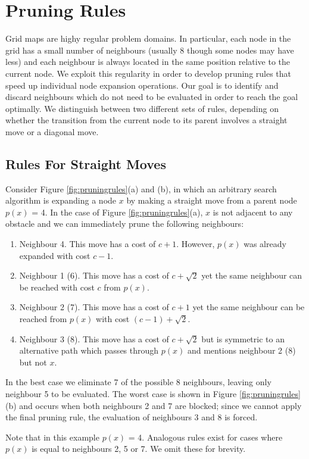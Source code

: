 \section{Pruning Rules}
Grid maps are highy regular problem domains. 
In particular, each node in the grid has a small number of neighbours (usually
8 though some nodes may have less) and each
neighbour is always located in the same position relative to the current node.
We exploit this regularity in order to develop pruning rules that speed up 
individual node expansion operations.
Our goal is to identify and discard neighbours
which do not need to be evaluated in order to reach the goal optimally.
We distinguish between two different sets of rules, depending on whether the 
transition from the current node to its parent involves a straight move or a
diagonal move.

\subsection{Rules For Straight Moves}
\label{sec:prunestraight}
Consider Figure \ref{fig:pruningrules}(a) and (b), in which an arbitrary search
algorithm is expanding a node $x$ by making a straight move from a parent node
$p(x)$ = 4.  In the case of Figure \ref{fig:pruningrules}(a), $x$ is not adjacent to
any obstacle and we can immediately prune the following neighbours:

\begin{enumerate}

\item Neighbour 4. This move has a cost of $c + 1$. However, $p(x)$ was already expanded
with cost $c - 1$.

\item Neighbour 1 (6). This move has a cost of $c  + \sqrt2$ yet the same neighbour
can be reached with cost $c$ from $p(x)$.

\item Neighbour 2 (7). This move has a cost of $c + 1$ yet the same neighbour  can
be reached from $p(x)$ with cost $(c - 1) + \sqrt2$.

\item Neighbour 3 (8). This move has a cost of $c + \sqrt2$ but is symmetric to an
alternative path which passes through $p(x)$ and mentions neighbour 2 (8) but
not $x$.

\end{enumerate}

\noindent In the best case we eliminate 7 of the possible 8 neighbours, leaving
only neighbour 5 to be evaluated.  The worst case is shown in Figure
\ref{fig:pruningrules}(b) and occurs when both neighbours 2 and 7 are blocked; 
since we cannot apply the final pruning rule, the evaluation of neighbours 3 and
8 is forced.
\par
Note that in this example $p(x)$ = 4. Analogous rules 
exist for cases where $p(x)$ is equal to neighbours 2, 5 or 7. We omit these for 
brevity.

